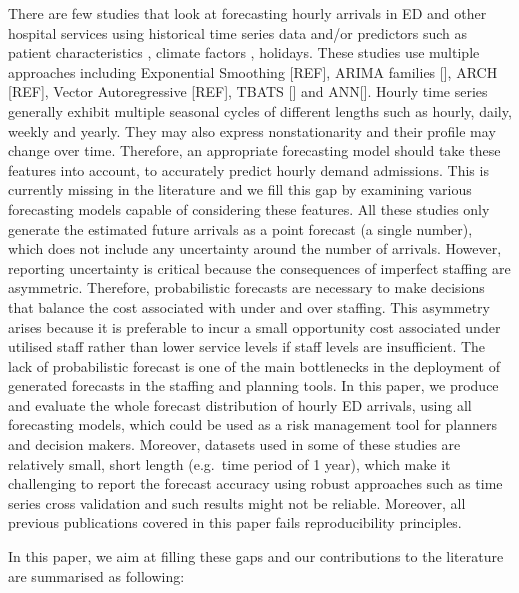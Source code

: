 \documentclass[]{elsarticle} %
\begin{document}
There are few studies that look at forecasting hourly arrivals in ED and other hospital services using historical time series data and/or predictors such as patient characteristics , climate factors , holidays. These studies use multiple approaches including Exponential Smoothing {[}REF{]}, ARIMA families {[}{]}, ARCH {[}REF{]}, Vector Autoregressive {[}REF{]}, TBATS {[}{]} and ANN{[}{]}. Hourly time series generally exhibit multiple seasonal cycles of different lengths such as hourly, daily, weekly and yearly. They may also express nonstationarity and their profile may change over time. Therefore, an appropriate forecasting model should take these features into account, to accurately predict hourly demand admissions. This is currently missing in the literature and we fill this gap by examining various forecasting models capable of considering these features. All these studies only generate the estimated future arrivals as a point forecast (a single number), which does not include any uncertainty around the number of arrivals. However, reporting uncertainty is critical because the consequences of imperfect staffing are asymmetric. Therefore, probabilistic forecasts are necessary to make decisions that balance the cost associated with under and over staffing. This asymmetry arises because it is preferable to incur a small opportunity cost associated under utilised staff rather than lower service levels if staff levels are insufficient. The lack of probabilistic forecast is one of the main bottlenecks in the deployment of generated forecasts in the staffing and planning tools. In this paper, we produce and evaluate the whole forecast distribution of hourly ED arrivals, using all forecasting models, which could be used as a risk management tool for planners and decision makers. Moreover, datasets used in some of these studies are relatively small, short length (e.g.~time period of 1 year), which make it challenging to report the forecast accuracy using robust approaches such as time series cross validation and such results might not be reliable. Moreover, all previous publications covered in this paper fails reproducibility principles.

In this paper, we aim at filling these gaps and our contributions to the literature are summarised as following:
\end{document}
